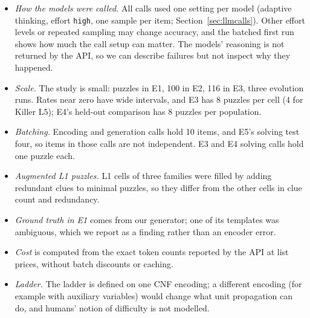 \begin{itemize}[leftmargin=1.2em,itemsep=1pt,topsep=2pt]
\item \emph{How the models were called.} All calls used one setting per model (adaptive thinking, effort \texttt{high}, one sample per item; Section~\ref{sec:llmcalls}). Other effort levels or repeated sampling may change accuracy, and the batched first run shows how much the call setup can matter. The models' reasoning is not returned by the API, so we can describe failures but not inspect why they happened.
\item \emph{Scale.} The study is small: \EOneN puzzles in E1, 100 in E2, 116 in E3, three evolution runs. Rates near zero have wide intervals, and E3 has 8 puzzles per cell (4 for Killer L5); E4's held-out comparison has 8 puzzles per population.
\item \emph{Batching.} Encoding and generation calls hold 10 items, and E5's solving test four, so items in those calls are not independent. E3 and E4 solving calls hold one puzzle each.
\item \emph{Augmented L1 puzzles.} L1 cells of three families were filled by adding redundant clues to minimal puzzles, so they differ from the other cells in clue count and redundancy.
\item \emph{Ground truth in E1} comes from our generator; one of its templates was ambiguous, which we report as a finding rather than an encoder error.
\item \emph{Cost} is computed from the exact token counts reported by the API at list prices, without batch discounts or caching.
\item \emph{Ladder.} The ladder is defined on one CNF encoding; a different encoding (for example with auxiliary variables) would change what unit propagation can do, and humans' notion of difficulty is not modelled.
\end{itemize}
